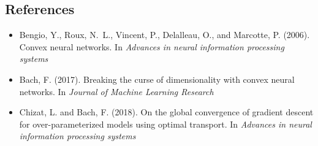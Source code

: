 \documentclass{beamer}
\begin{document}
\subsection{References}

\begin{frame}{\subsecname}

\begin{itemize}

\item Bengio, Y., Roux, N.~L., Vincent, P., Delalleau, O., and Marcotte, P. (2006). Convex neural networks. In \textit{Advances in neural information processing systems}

\item Bach, F. (2017). Breaking the curse of dimensionality with convex neural networks. In \textit{Journal of Machine Learning Research}

\item Chizat, L. and Bach, F. (2018).
On the global convergence of gradient descent for over-parameterized
  models using optimal transport. In \textit{Advances in neural information processing systems}
\end{itemize}

\end{frame}
\end{document}
